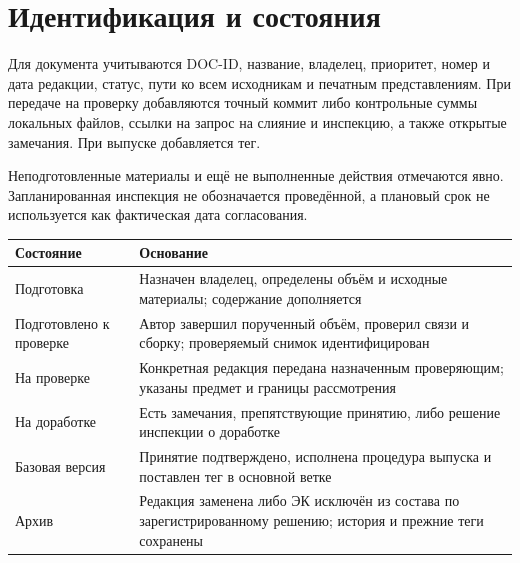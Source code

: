 \documentclass[12pt,a4paper]{article}
\newcounter{none} %
\begin{document}
\section{Идентификация и состояния}\label{4-ux438ux434ux435ux43dux442ux438ux444ux438ux43aux430ux446ux438ux44f-ux438-ux441ux43eux441ux442ux43eux44fux43dux438ux44f}

\hypertarget{4-идентификация-и-состояния}{}

Для документа учитываются DOC-ID, название, владелец, приоритет, номер и дата редакции, статус, пути ко всем исходникам и печатным представлениям. При передаче на проверку добавляются точный коммит либо контрольные суммы локальных файлов, ссылки на запрос на слияние и инспекцию, а также открытые замечания. При выпуске добавляется тег.

Неподготовленные материалы и ещё не выполненные действия отмечаются явно. Запланированная инспекция не обозначается проведённой, а плановый срок не используется как фактическая дата согласования.

{\def\LTcaptype{none} %
\begin{longtable}[]{@{}
  >{\raggedright\arraybackslash}p{}
  >{\raggedright\arraybackslash}p{}@{}}
\toprule\noalign{}
\begin{minipage}[b]{\linewidth}\raggedright
Состояние
\end{minipage} & \begin{minipage}[b]{\linewidth}\raggedright
Основание
\end{minipage} \\
\midrule\noalign{}
\endhead
\bottomrule\noalign{}
\endlastfoot
Подготовка & Назначен владелец, определены объём и исходные материалы; содержание дополняется \\
Подготовлено к проверке & Автор завершил порученный объём, проверил связи и сборку; проверяемый снимок идентифицирован \\
На проверке & Конкретная редакция передана назначенным проверяющим; указаны предмет и границы рассмотрения \\
На доработке & Есть замечания, препятствующие принятию, либо решение инспекции о доработке \\
Базовая версия & Принятие подтверждено, исполнена процедура выпуска и поставлен тег в основной ветке \\
Архив & Редакция заменена либо ЭК исключён из состава по зарегистрированному решению; история и прежние теги сохранены \\
\end{longtable}
}
\end{document}
